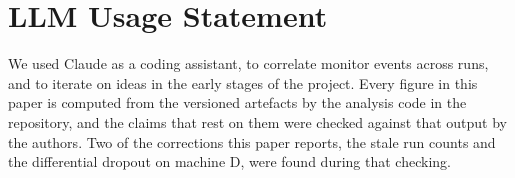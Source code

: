 \section*{LLM Usage Statement}

We used Claude as a coding assistant, to correlate monitor events across
runs, and to iterate on ideas in the early stages of the project. Every
figure in this paper is computed from the versioned artefacts by the analysis
code in the repository, and the claims that rest on them were checked against
that output by the authors. Two of the corrections this paper reports, the
stale run counts and the differential dropout on machine D, were found during
that checking.
